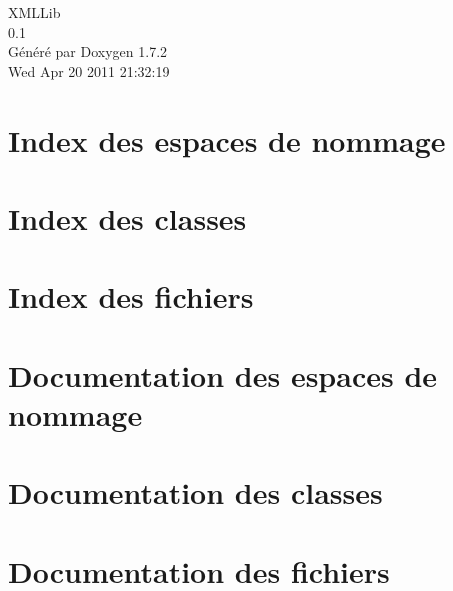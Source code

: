 \documentclass[a4paper]{book}
\begin{document}
\hypersetup{pageanchor=false}
\begin{titlepage}
\vspace*{7cm}
\begin{center}
{\Large XMLLib \\[1ex]\large 0.1 }\\
\vspace*{1cm}
{\large Généré par Doxygen 1.7.2}\\
\vspace*{0.5cm}
{\small Wed Apr 20 2011 21:32:19}\\
\end{center}
\end{titlepage}
\clearemptydoublepage
{}
\tableofcontents
\clearemptydoublepage
{}
\hypersetup{pageanchor=true}
\chapter{Index des espaces de nommage}

\chapter{Index des classes}

\chapter{Index des fichiers}

\chapter{Documentation des espaces de nommage}

\chapter{Documentation des classes}





\chapter{Documentation des fichiers}










\printindex
\end{document}
